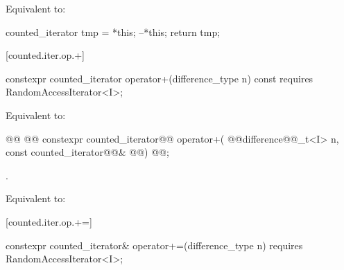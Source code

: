\begin{addedblock}
\begin{itemdescr}
\pnum
\effects Equivalent to:
\begin{codeblock}
counted_iterator tmp = *this;
--*this;
return tmp;
\end{codeblock}
\end{itemdescr}

[counted.iter.op.+]{}

%
%
\begin{itemdecl}
  constexpr counted_iterator operator+(difference_type n) const
    requires RandomAccessIterator<I>;
\end{itemdecl}

\begin{itemdescr}
\pnum
\requires {}

\pnum
\effects Equivalent to:
\end{itemdescr}

%
%
\begin{itemdecl}
@@
  @@ constexpr counted_iterator@@ operator+(
    @@difference@@_t<I> n, const counted_iterator@@& @@)
      @@;
\end{itemdecl}

\begin{itemdescr}
\pnum
\requires {}.

\pnum
\effects Equivalent to:
\end{itemdescr}

[counted.iter.op.+=]{}

%
%
\begin{itemdecl}
  constexpr counted_iterator& operator+=(difference_type n)
    requires RandomAccessIterator<I>;
\end{itemdecl}

\begin{itemdescr}
\pnum
\requires {}


\end{itemdescr}
\end{addedblock}
